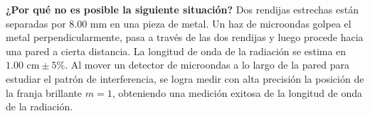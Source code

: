 \item \textbf{¿Por qué no es posible la siguiente situación?}
Dos rendijas estrechas están separadas por $8.00\text{ mm}$ en una pieza de metal. Un haz de microondas golpea el metal perpendicularmente, pasa a través de las dos rendijas y luego procede hacia una pared a cierta distancia. La longitud de onda de la radiación se estima en $1.00\text{ cm} \pm 5\%$. Al mover un detector de microondas a lo largo de la pared para estudiar el patrón de interferencia, se logra medir con alta precisión la posición de la franja brillante $m = 1$, obteniendo una medición exitosa de la longitud de onda de la radiación.